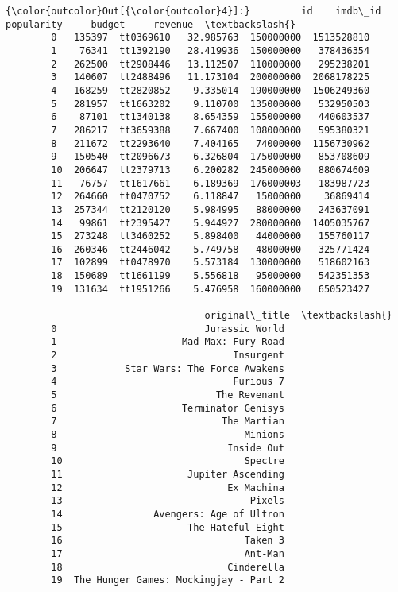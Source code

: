 \documentclass[11pt]{article}
\begin{document}
\begin{Verbatim}[commandchars=\\\{\}]
{\color{outcolor}Out[{\color{outcolor}4}]:}         id    imdb\_id  popularity     budget     revenue  \textbackslash{}
        0   135397  tt0369610   32.985763  150000000  1513528810   
        1    76341  tt1392190   28.419936  150000000   378436354   
        2   262500  tt2908446   13.112507  110000000   295238201   
        3   140607  tt2488496   11.173104  200000000  2068178225   
        4   168259  tt2820852    9.335014  190000000  1506249360   
        5   281957  tt1663202    9.110700  135000000   532950503   
        6    87101  tt1340138    8.654359  155000000   440603537   
        7   286217  tt3659388    7.667400  108000000   595380321   
        8   211672  tt2293640    7.404165   74000000  1156730962   
        9   150540  tt2096673    6.326804  175000000   853708609   
        10  206647  tt2379713    6.200282  245000000   880674609   
        11   76757  tt1617661    6.189369  176000003   183987723   
        12  264660  tt0470752    6.118847   15000000    36869414   
        13  257344  tt2120120    5.984995   88000000   243637091   
        14   99861  tt2395427    5.944927  280000000  1405035767   
        15  273248  tt3460252    5.898400   44000000   155760117   
        16  260346  tt2446042    5.749758   48000000   325771424   
        17  102899  tt0478970    5.573184  130000000   518602163   
        18  150689  tt1661199    5.556818   95000000   542351353   
        19  131634  tt1951266    5.476958  160000000   650523427   
        
                                   original\_title  \textbackslash{}
        0                          Jurassic World   
        1                      Mad Max: Fury Road   
        2                               Insurgent   
        3            Star Wars: The Force Awakens   
        4                               Furious 7   
        5                            The Revenant   
        6                      Terminator Genisys   
        7                             The Martian   
        8                                 Minions   
        9                              Inside Out   
        10                                Spectre   
        11                      Jupiter Ascending   
        12                             Ex Machina   
        13                                 Pixels   
        14                Avengers: Age of Ultron   
        15                      The Hateful Eight   
        16                                Taken 3   
        17                                Ant-Man   
        18                             Cinderella   
        19  The Hunger Games: Mockingjay - Part 2   
        

\end{Verbatim}
\end{document}
